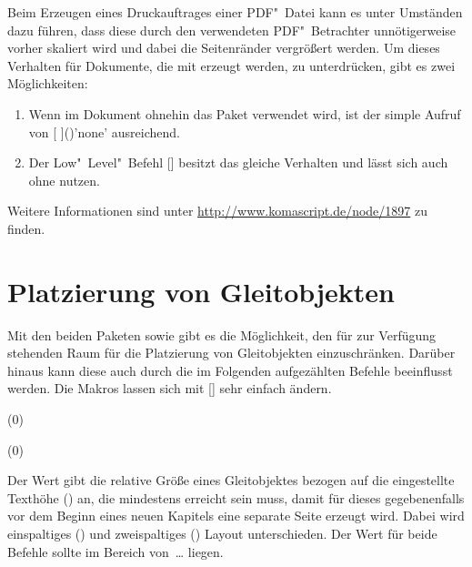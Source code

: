 %
Beim Erzeugen eines Druckauftrages einer PDF"~Datei kann es unter Umständen 
dazu führen, dass diese durch den verwendeten PDF"~Betrachter unnötigerweise 
vorher skaliert wird und dabei die Seitenränder vergrößert werden. Um dieses 
Verhalten für Dokumente, die mit  erzeugt werden, zu 
unterdrücken, gibt es zwei Möglichkeiten:
%
\begin{enumerate}
\item Wenn im Dokument ohnehin das Paket  verwendet wird, 
  ist der simple Aufruf von
  [%
  ]()'none'
  ausreichend.
\item Der Low"~Level"~Befehl
  []
  besitzt das gleiche Verhalten und lässt sich auch ohne  
  nutzen.
\end{enumerate}
%
Weitere Informationen sind unter \url{http://www.komascript.de/node/1897} 
zu finden.



\section{%
  Platzierung von Gleitobjekten%
  \label{sec:tips:floats}%
}

Mit den beiden Paketen  sowie  gibt es die 
Möglichkeit, den für  zur Verfügung stehenden Raum für die 
Platzierung von Gleitobjekten einzuschränken. Darüber hinaus kann diese auch 
durch die im Folgenden aufgezählten Befehle beeinflusst werden. Die Makros 
lassen sich mit [] 
sehr einfach ändern.

\begin{Declaration}
  {}
  (0\floatpagefraction)
\begin{Declaration}
  {}
  (0\dblfloatpagefraction)
\printdeclarationlist

Der Wert gibt die relative Größe eines Gleitobjektes bezogen auf die 
eingestellte Texthöhe () an, die mindestens erreicht sein 
muss, damit für dieses gegebenenfalls vor dem Beginn eines neuen Kapitels eine 
separate Seite erzeugt wird. Dabei wird einspaltiges 
() und zweispaltiges () 
Layout unterschieden. Der Wert für beide Befehle sollte im Bereich 
von~\dots{} liegen.
\end{Declaration}
\end{Declaration}

